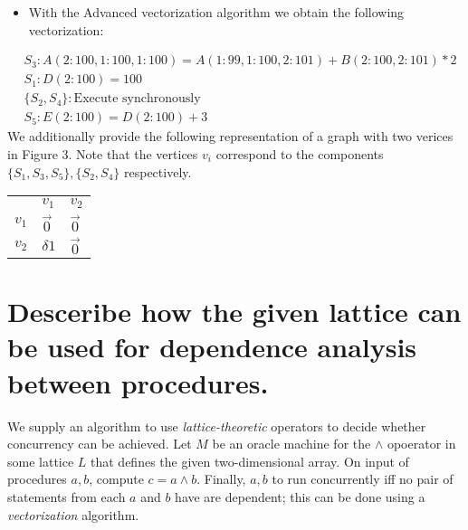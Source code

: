 \documentclass[11pt]{article}
\begin{document}
\begin{itemize}
\item With the Advanced vectorization algorithm we obtain the following vectorization:
\end{itemize}
\begin{align*}
  & S_{3}: A(2:100, 1:100, 1:100) = A(1:99, 1:100, 2:101) + B(2:100, 2:101) * 2 \nonumber \\
  & S_{1}: D(2:100) = 100 \nonumber \\
  & \{S_{2}, S_{4}\}: \text{Execute synchronously} \nonumber \\
  & S_{5}: E(2:100) = D(2:100) + 3 \nonumber
\end{align*}
We additionally provide the following representation of a graph with two verices in Figure 3. Note that the vertices \(v_{i}\) correspond to the components \(\{S_{1}, S_{3}, S_{5}\}, \{S_{2}, S_{4}\}\) respectively.
\begin{center}
\begin{tabular}{lll}
 & \(v_{1}\) & \(v_{2}\)\\
\(v_{1}\) & \(\vec{0}\) & \(\vec{0}\)\\
\(v_{2}\) & \(\delta{1}\) & \(\vec{0}\)\\
\end{tabular}
\end{center}
\section{Desceribe how the given lattice can be used for dependence analysis between procedures.}
\label{sec:orgceeff9f}
We supply an algorithm to use \emph{lattice-theoretic} operators to decide whether concurrency can be achieved. Let \(M\) be an oracle machine for the \(\land\) opoerator in some lattice \(L\) that defines the given two-dimensional array. On input of procedures \(a, b\), compute \(c = a \land b\). Finally, \(a, b\) to run concurrently iff no pair of statements from each \(a\) and \(b\) have are dependent; this can be done using a \emph{vectorization} algorithm.
\end{document}
